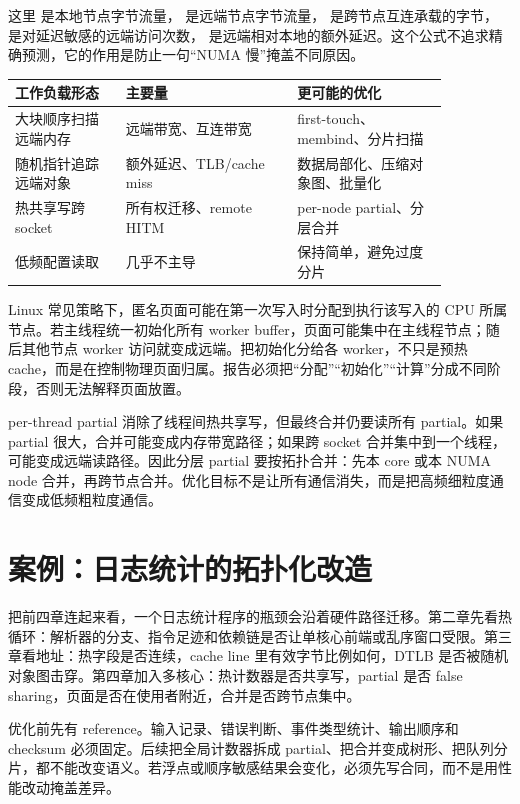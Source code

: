 这里  是本地节点字节流量， 是远端节点字节流量， 是跨节点互连承载的字节， 是对延迟敏感的远端访问次数， 是远端相对本地的额外延迟。这个公式不追求精确预测，它的作用是防止一句“NUMA 慢”掩盖不同原因。

\begin{center}
\begin{tabular}{p{0.22\linewidth}p{0.34\linewidth}p{0.30\linewidth}}
\toprule
工作负载形态 & 主要量 & 更可能的优化 \\
\midrule
大块顺序扫描远端内存 & 远端带宽、互连带宽 & first-touch、membind、分片扫描 \\
随机指针追踪远端对象 & 额外延迟、TLB/cache miss & 数据局部化、压缩对象图、批量化 \\
热共享写跨 socket & 所有权迁移、remote HITM & per-node partial、分层合并 \\
低频配置读取 & 几乎不主导 & 保持简单，避免过度分片 \\
\bottomrule
\end{tabular}
\end{center}

Linux 常见策略下，匿名页面可能在第一次写入时分配到执行该写入的 CPU 所属节点。若主线程统一初始化所有 worker buffer，页面可能集中在主线程节点；随后其他节点 worker 访问就变成远端。把初始化分给各 worker，不只是预热 cache，而是在控制物理页面归属。报告必须把“分配”“初始化”“计算”分成不同阶段，否则无法解释页面放置。

per-thread partial 消除了线程间热共享写，但最终合并仍要读所有 partial。如果 partial 很大，合并可能变成内存带宽路径；如果跨 socket 合并集中到一个线程，可能变成远端读路径。因此分层 partial 要按拓扑合并：先本 core 或本 NUMA node 合并，再跨节点合并。优化目标不是让所有通信消失，而是把高频细粒度通信变成低频粗粒度通信。

\section{案例：日志统计的拓扑化改造}

把前四章连起来看，一个日志统计程序的瓶颈会沿着硬件路径迁移。第二章先看热循环：解析器的分支、指令足迹和依赖链是否让单核心前端或乱序窗口受限。第三章看地址：热字段是否连续，cache line 里有效字节比例如何，DTLB 是否被随机对象图击穿。第四章加入多核心：热计数器是否共享写，partial 是否 false sharing，页面是否在使用者附近，合并是否跨节点集中。

优化前先有 reference。输入记录、错误判断、事件类型统计、输出顺序和 checksum 必须固定。后续把全局计数器拆成 partial、把合并变成树形、把队列分片，都不能改变语义。若浮点或顺序敏感结果会变化，必须先写合同，而不是用性能改动掩盖差异。

